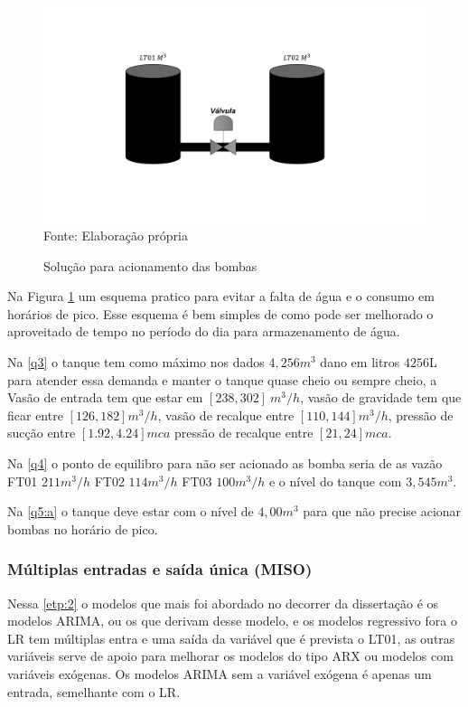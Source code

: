 \begin{figure}[H]
	\centering
	\caption{Solução para acionamento das bombas}
	\label{fig:esquema}
	\includegraphics[width=1\linewidth]{Resultados/Figuras/esquema}
	Fonte: Elaboração própria 
\end{figure}

Na Figura \ref{fig:esquema} um esquema pratico para evitar a falta de água e o consumo em horários de pico. Esse esquema é bem simples de como pode ser melhorado o aproveitado de tempo no período do dia para armazenamento de água.

Na \ref{q3} o tanque tem como máximo nos dados $4,256 m^3$ dano em litros $4256$L para atender essa demanda e manter o tanque quase cheio ou sempre cheio, a Vasão de entrada tem que estar em $[238,302] \ m^3/h$, vasão de gravidade tem que ficar entre $[126,182] m^3/h$, vasão de recalque entre $[110,144] m^3/h$, pressão de sucção entre $[1.92,4.24] mca$ pressão de recalque entre $[21,24] mca$.

Na \ref{q4} o ponto de equilibro para não ser acionado as bomba seria de as vazão FT01 $211 m^3/h$  FT02 $114 m^3/h$ FT03 $100m^3/h$ e o nível do tanque com $3,545 m^3$.

Na \ref{q5:a} o tanque deve estar com o nível de $4,00 m^3$ para que não precise acionar bombas no horário de pico. 

\subsubsection{M\'ultiplas entradas e sa\'ida \'unica (MISO)}

Nessa \ref{etp:2} o modelos que mais foi abordado no decorrer da dissertação é os modelos ARIMA, ou os que derivam desse modelo, e os modelos regressivo fora o LR  tem múltiplas entra e uma saída da variável que é prevista o LT01, as outras variáveis serve de apoio para melhorar os modelos do tipo ARX ou modelos com variáveis exógenas. Os modelos ARIMA sem a variável exógena é apenas um entrada, semelhante com o LR.



